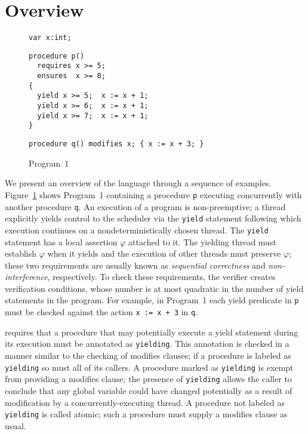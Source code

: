 \section{Overview}
\label{sec:overview}
\begin{figure}
\begin{verbatim}
var x:int;
\end{verbatim}
\begin{verbatim}
procedure p()
  requires x >= 5;
  ensures  x >= 8;
{
  yield x >= 5;  x := x + 1;
  yield x >= 6;  x := x + 1;
  yield x >= 7;  x := x + 1;
}
\end{verbatim}
\begin{verbatim}
procedure q() modifies x; { x := x + 3; }
\end{verbatim}
\caption{Program~1}
\label{fig:ex1}
\end{figure}

We present an overview of the \civl language through a sequence of examples.
Figure~\ref{fig:ex1} shows Program~1 containing a procedure {\tt p}
executing concurrently with another procedure {\tt q}. 
An execution of a \civl program is non-preemptive; a thread explicitly yields control to the
scheduler via the {\tt yield} statement following which execution continues on a 
nondeterministically chosen thread.
The {\tt yield} statement has a local assertion $\varphi$ attached to it.
The yielding thread must establish $\varphi$ when it yields and the execution of other threads 
must preserve $\varphi$; these two requirements are usually known as {\em sequential correctness}
and {\em non-interference}, respectively.
To check these requirements, the \civl verifier creates verification conditions, whose number is at most
quadratic in the number of yield statements in the program.
For example, in Program~1 each yield predicate in {\tt p} must be checked against the action 
{\tt x := x + 3} in {\tt q}.

\civl requires that a procedure that may potentially execute a yield statement during its execution 
must be annotated as {\tt yielding}.
This annotation is checked in a manner similar to the checking of modifies clauses; if a procedure is labeled 
as {\tt yielding} so must all of its callers.
A procedure marked as {\tt yielding} is exempt from providing a modifies clause; 
the presence of {\tt yielding} allows the caller to conclude that any global variable could have changed
potentially as a result of modification by a concurrently-executing thread.
A procedure not labeled as {\tt yielding} is called atomic; such a procedure must supply a modifies clause as usual.

